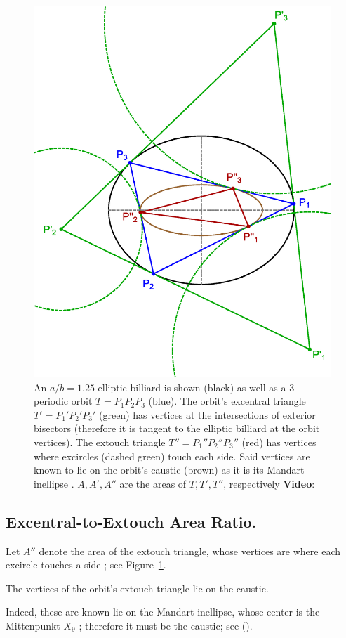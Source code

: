 \begin{figure}[H]
    \centering
    \includegraphics[width=.6\textwidth]{1090_orbit_outer_inner}
    \caption{An $a/b=1.25$ elliptic billiard is shown (black) as well as a 3-periodic orbit $T=P_1P_2P_3$ (blue). The orbit's excentral triangle $T'=P_1'P_2'P_3'$ (green) has vertices at the intersections of exterior bisectors (therefore it is tangent to the elliptic billiard at the orbit vertices). The extouch triangle $T''=P_1''P_2''P_3''$ (red) has vertices   where excircles (dashed green) touch each side. Said vertices are known to lie on the orbit's caustic (brown) as it is its Mandart inellipse \cite[Mandart Inellipse]{mw}.  $A,A',A''$ are the areas of $T,T',T''$, respectively \textbf{Video}: \cite[PL\#06]{reznik2020-playlist-proofs}}
    \label{fig:orbit-outer-inner}
\end{figure}

\subsection{Excentral-to-Extouch Area Ratio.}

Let $A''$ denote the area of the extouch triangle, whose vertices are where each excircle touches a side \cite[Extouch Triangle]{mw}; see Figure~\ref{fig:orbit-outer-inner}.

\begin{remark}  
The vertices of the orbit's extouch triangle lie on the caustic.
\end{remark}

Indeed, these are known lie on the Mandart inellipse, whose center is the Mittenpunkt $X_9$ \cite[Mandart Inellipse]{mw}; therefore it must be the caustic; see (\cite[PL\#06]{reznik2020-playlist-proofs}).

